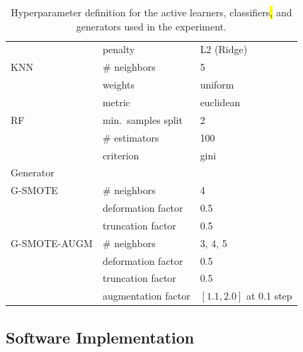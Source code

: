 \documentclass[preprint, 12pt]{elsarticle}
\begin{document}
\begin{table}[H]
\begin{tabular}{lll}
                        & penalty                          & L2 (Ridge)                     \\
		KNN             & \# neighbors                     & 5                              \\
                        & weights                          & uniform                        \\
                        & metric                           & euclidean                      \\
		RF              & min.\ samples split              & 2                              \\
		                & \# estimators                    & 100                            \\
                        & criterion                        & gini                           \\
		\toprule
		Generator       &                                  &                                \\
		\midrule
		G-SMOTE         & \# neighbors                     & 4                              \\
                        & deformation factor               & 0.5                            \\
                        & truncation factor                & 0.5                            \\
		G-SMOTE-AUGM    & \# neighbors                     & 3, 4, 5                        \\
                        & deformation factor               & 0.5                            \\
                        & truncation factor                & 0.5                            \\
                        & augmentation factor              & $[1.1, 2.0]$ at 0.1 step       \\
		\bottomrule
	\end{tabular}
    \caption{\label{tab:grid}
        Hyperparameter definition for the active learners, classifiers\hl{,}
        and generators used in the experiment.
    }
\end{table}
 
\subsection{Software Implementation}~\label{sec:software_implementation}
\end{document}
